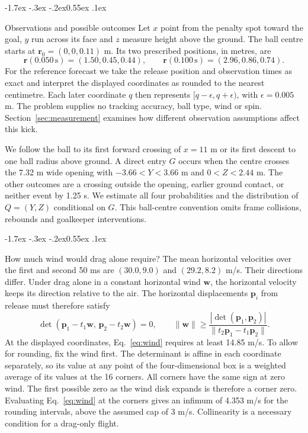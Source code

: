 \documentclass[11pt,letterpaper]{article}
\makeatletter
\renewcommand{\subsection}{\reserveheadroom\@startsection{subsection}{2}{\z@}
  {-1.7ex \@plus -.3ex \@minus -.2ex}{0.55ex \@plus .1ex}
  {\normalfont\normalsize\sffamily\bfseries\color{black}\raggedright}}
\newcommand{\vv}[1]{\boldsymbol{#1}}
\newcommand{\norm}[1]{\lVert #1\rVert}
\newcommand{\reserveheadroom}{\par\ifdim\dimexpr\pagegoal-\pagetotal\relax<5\baselineskip\newpage\fi}
\makeatother
\begin{document}
\subsection{Observations and possible outcomes}
Let \(x\) point from the penalty spot toward the goal, \(y\) run across its face and \(z\) measure height above the ground. The ball centre starts at \(\vv r_0=(0,0,0.11)\) m. Its two prescribed positions, in metres, are
\begin{equation}
 \vv r(0.050\,\mathrm{s})=(1.50,0.45,0.44),\qquad
 \vv r(0.100\,\mathrm{s})=(2.96,0.86,0.74).
 \label{eq:data}
\end{equation}
For the reference forecast we take the release position and observation times as exact and interpret the displayed coordinates as rounded to the nearest centimetre. Each later coordinate \(q\) then represents \([q-\epsilon,q+\epsilon)\), with \(\epsilon=0.005\) m. The problem supplies no tracking accuracy, ball type, wind or spin. Section~\ref{sec:measurement} examines how different observation assumptions affect this kick.

We follow the ball to its first forward crossing of \(x=11\) m or its first descent to one ball radius above ground. A direct entry \(G\) occurs when the centre crosses the 7.32 m wide opening with \(-3.66<Y<3.66\) m and \(0<Z<2.44\) m. The other outcomes are a crossing outside the opening, earlier ground contact, or neither event by 1.25 s. We estimate all four probabilities and the distribution of \(Q=(Y,Z)\) conditional on \(G\). This ball-centre convention omits frame collisions, rebounds and goalkeeper interventions.

\subsection{How much wind would drag alone require?}
\label{sec:wind}
The mean horizontal velocities over the first and second 50 ms are \((30.0,9.0)\) and \((29.2,8.2)\) m/s. Their directions differ. Under drag alone in a constant horizontal wind \(\vv w\), the horizontal velocity keeps its direction relative to the air. The horizontal displacements \(\vv p_i\) from release must therefore satisfy
\begin{equation}
 \det(\vv p_1-t_1\vv w,\,\vv p_2-t_2\vv w)=0,
 \qquad
 \norm{\vv w}\ge
 \frac{|\det(\vv p_1,\vv p_2)|}{\norm{t_2\vv p_1-t_1\vv p_2}} .
 \label{eq:wind}
\end{equation}
At the displayed coordinates, Eq.~\eqref{eq:wind} requires at least 14.85 m/s. To allow for rounding, fix the wind first. The determinant is affine in each coordinate separately, so its value at any point of the four-dimensional box is a weighted average of its values at the 16 corners. All corners have the same sign at zero wind. The first possible zero as the wind disk expands is therefore a corner zero. Evaluating Eq.~\eqref{eq:wind} at the corners gives an infimum of 4.353 m/s for the rounding intervals, above the assumed cap of 3 m/s. Collinearity is a necessary condition for a drag-only flight.
\end{document}
